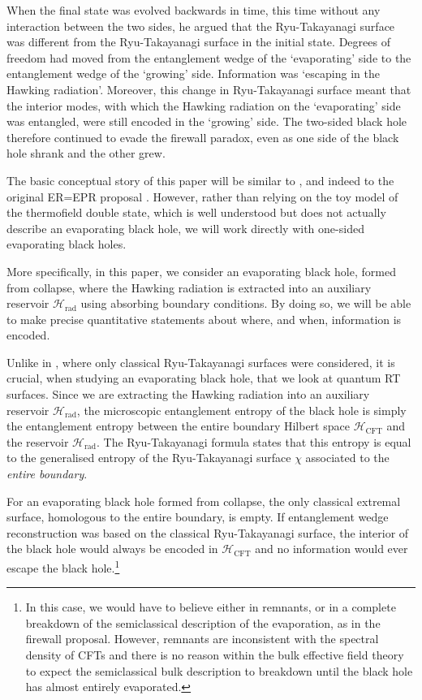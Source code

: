 \documentclass[11pt,a4paper]{article}
\begin{document}
When the final state was evolved backwards in time, this time without any interaction between the two sides, he argued that the Ryu-Takayanagi surface was different from the Ryu-Takayanagi surface in the initial state. Degrees of freedom had moved from the entanglement wedge of the `evaporating' side to the entanglement wedge of the `growing' side. Information was `escaping in the Hawking radiation'. Moreover, this change in Ryu-Takayanagi surface meant that the interior modes, with which the Hawking radiation on the `evaporating' side was entangled, were still encoded in the `growing' side. The two-sided black hole therefore continued to evade the firewall paradox, even as one side of the black hole shrank and the other grew.

The basic conceptual story of this paper will be similar to \cite{almheiri2018holographic}, and indeed to the original ER=EPR proposal \cite{maldacena2013cool}. However, rather than relying on the toy model of the thermofield double state, which is well understood but does not actually describe an evaporating black hole, we will work directly with one-sided evaporating black holes. 

More specifically, in this paper, we consider an evaporating black hole, formed from collapse, where the Hawking radiation is extracted into an auxiliary reservoir $\mathcal{H}_\text{rad}$ using absorbing boundary conditions. By doing so, we will be able to make precise quantitative statements about where, and when, information is encoded. 

Unlike in \cite{almheiri2018holographic}, where only classical Ryu-Takayanagi surfaces were considered, it is crucial, when studying an evaporating black hole, that we look at quantum RT surfaces. Since we are extracting the Hawking radiation into an auxiliary reservoir $\mathcal{H}_\text{rad}$, the microscopic entanglement entropy of the black hole is simply the entanglement entropy between the entire boundary Hilbert space $\mathcal{H}_\text{CFT}$ and the reservoir $\mathcal{H}_\text{rad}$. The Ryu-Takayanagi formula states that this entropy is equal to the generalised entropy of the Ryu-Takayanagi surface $\chi$ associated to the \emph{entire boundary}. 

For an evaporating black hole formed from collapse, the only classical extremal surface, homologous to the entire boundary, is empty. If entanglement wedge reconstruction was based on the classical Ryu-Takayanagi surface, the interior of the black hole would always be encoded in $\mathcal{H}_\text{CFT}$ and no information would ever escape the black hole.\footnote{In this case, we would have to believe either in remnants, or in a complete breakdown of the semiclassical description of the evaporation, as in the firewall proposal. However, remnants are inconsistent with the spectral density of CFTs and there is no reason within the bulk effective field theory to expect the semiclassical bulk description to breakdown until the black hole has almost entirely evaporated.}
\end{document}

